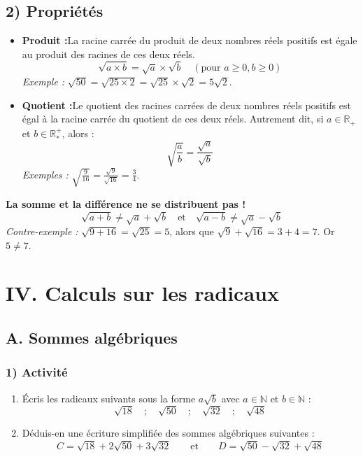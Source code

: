 \documentclass[12pt,a4paper]{article}
\begin{document}
\subsection*{\color{myred} 2) Propriétés}
\begin{itemize}
    \item \textbf{Produit :}La racine carrée du produit de deux nombres réels positifs est égale au produit des racines de ces deux réels. 
  $$\sqrt{a \times b} = \sqrt{a} \times \sqrt{b} \quad (\text{pour } a \ge 0, b \ge 0)$$
  \textit{Exemple :} $\sqrt{50} = \sqrt{25 \times 2} = \sqrt{25} \times \sqrt{2} = 5\sqrt{2}$.
    \item \textbf{Quotient :}Le quotient des racines carrées de deux nombres réels positifs est égal à la racine carrée du quotient de ces deux réels. Autrement dit, si $a \in \mathbb{R}_+$ et $b \in \mathbb{R}_*^+$, alors :
  $$\sqrt{\frac{a}{b}} = \frac{\sqrt{a}}{\sqrt{b}}$$
  \textit{Exemples :} $\sqrt{\frac{9}{16}} = \frac{\sqrt{9}}{\sqrt{16}} = \frac{3}{4}$.
\end{itemize}

\begin{tcolorbox}[colback=red!10!white,colframe=myred,title=\textbf{Attention / Erreur fréquente}]
\textbf{La somme et la différence ne se distribuent pas !}
$$\sqrt{a + b} \neq \sqrt{a} + \sqrt{b} \quad \text{et} \quad \sqrt{a - b} \neq \sqrt{a} - \sqrt{b}$$
\textit{Contre-exemple :} $\sqrt{9 + 16} = \sqrt{25} = 5$, alors que $\sqrt{9} + \sqrt{16} = 3 + 4 = 7$. Or $5 \neq 7$.
\end{tcolorbox}

\section*{\color{myred}IV. Calculs sur les radicaux}

\subsection*{A. Sommes algébriques}

\subsubsection*{\color{myred} 1) Activité}
\begin{enumerate}[label=\alph*)]
    \item Écris les radicaux suivants sous la forme $a\sqrt{b}$ avec $a \in \mathbb{N}$ et $b \in \mathbb{N}$ :
    \[
    \sqrt{18} \quad ; \quad \sqrt{50} \quad ; \quad \sqrt{32} \quad ; \quad \sqrt{48}
    \]
    \item Déduis-en une écriture simplifiée des sommes algébriques suivantes :
    \[
    C = \sqrt{18} + 2\sqrt{50} + 3\sqrt{32} \qquad \text{et} \qquad D = \sqrt{50} - \sqrt{32} + \sqrt{48}
    \]
\end{enumerate}
\end{document}
